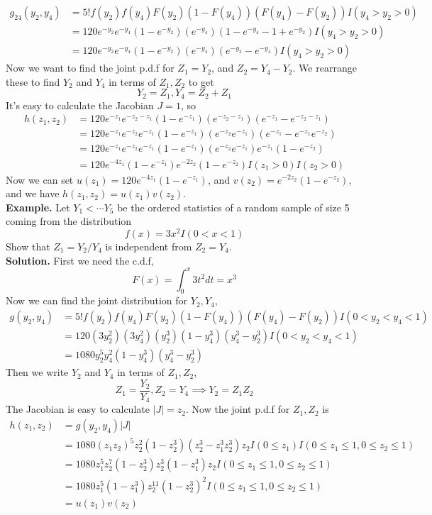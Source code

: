 \documentclass[openany]{report}
\begin{document}
    \begin{align*}
        g_{24}(y_2,y_4) &= 5!f(y_2)f(y_4)F(y_2)(1-F(y_4))(F(y_4) - F(y_2))I(y_4 > y_2 > 0)  \\
        &= 120e^{-y_2}e^{-y_4}(1-e^{-y_2})(e^{-y_4})(1 - e^{-y_4}- 1 + e^{-y_2})I(y_4 > y_2 > 0)\\
        &=120e^{-y_2}e^{-y_4}(1-e^{-y_2})(e^{-y_4})(e^{-y_2} -e^{-y_4})I(y_4 > y_2 > 0)
    \end{align*}
    Now we want to find the joint p.d.f for $Z_1 = Y_2$, and $Z_2 = Y_4 - Y_2$. We rearrange these to find $Y_2$ and $Y_4$ in terms of $Z_1,Z_2$ to get 
    \[Y_2 = Z_1, Y_4 = Z_2 + Z_1\]
    It's easy to calculate the Jacobian $J = 1$, so 
    \begin{align*}
        h(z_1,z_2) &= 120e^{-z_1}e^{-z_2 - z_1}(1-e^{-z_1})(e^{-z_2 - z_1})(e^{-z_1} - e^{-z_2 - z_1})\\
        &=120e^{-z_1}e^{-z_2}e^{-z_1}(1-e^{-z_1})(e^{-z_2}e^{-z_1})(e^{-z_1}-e^{-z_1}e^{-z_2})\\
        &=120e^{-z_1}e^{-z_2}e^{-z_1}(1-e^{-z_1})(e^{-z_2}e^{-z_1})e^{-z_1}(1-e^{-z_2})\\
        &= 120e^{-4z_1}(1-e^{-z_1})e^{-2z_2}(1-e^{-z_2})I(z_1 > 0)I(z_2 > 0)
    \end{align*}
    Now we can set $u(z_1) = 120e^{-4z_1}(1-e^{-z_1})$, and $v(z_2) = e^{-2z_2}(1-e^{-z_2})$, and we have $h(z_1, z_2) = u(z_1)v(z_2)$.\\[2ex]
    \textbf{Example.} Let $Y_1 < \cdots Y_5$ be the ordered statistics of a random sample of size 5 coming from the distribution 
    \[f(x) = 3x^2I(0 < x < 1)\]
    Show that $Z_1 = Y_2 / Y_4$ is independent from $Z_2 = Y_4$.\\[2ex]
    \textbf{Solution.} First we need the c.d.f,
    \[F(x) = \int_0^x 3t^2dt = x^3\]
    Now we can find the joint distribution for $Y_2, Y_4$, 
    \begin{align*}
        g(y_2,y_4) &= 5!f(y_2)f(y_4)F(y_2)(1-F(y_4))(F(y_4) - F(y_2))I(0 < y_2 < y_4 < 1)\\
        &= 120(3y_2^2)(3y_4^2)(y_2^3)(1 - y_4^3)(y_4^3 - y_2^3)I(0 < y_2 < y_4 < 1)\\
        &= 1080y_2^5y_4^2(1-y_4^3)(y_4^3-y_2^3)
    \end{align*}
    Then we write $Y_2$ and $Y_4$ in terms of $Z_1, Z_2$, 
    \[Z_1 = \frac{Y_2}{Y_4}, Z_2 = Y_4 \implies Y_2 = Z_1Z_2\]
    The Jacobian is easy to calculate $|J| = z_2$. Now the joint p.d.f for $Z_1,Z_2$ is 
    \begin{align*}
        h(z_1,z_2) &= g(y_2,y_4)|J|\\
        &= 1080(z_1z_2)^5z_2^2(1-z_2^3)(z_2^3 - z_1^3z_2^3)z_2I(0 \leq z_1)I(0 \leq z_1 \leq 1, 0 \leq z_2 \leq 1)\\
        &= 1080z_1^5z_2^7(1-z_2^3)z_2^3(1 - z_1^3)z_2I(0 \leq z_1 \leq 1, 0 \leq z_2 \leq 1)\\
        &= 1080z_1^5(1-z_1^3)z_2^{11}(1-z_2^3)^2I(0 \leq z_1 \leq 1, 0 \leq z_2 \leq 1)\\
        &= u(z_1)v(z_2)
    \end{align*}
\end{document}
